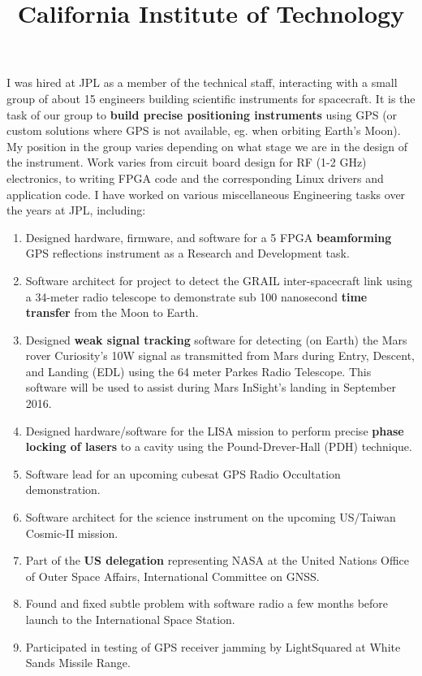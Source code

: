 \begin{resume}
\title{\bf California Institute of Technology}
\begin{position}
    I was hired at JPL as a member of the technical staff, interacting with a small group of about 15 engineers building scientific instruments for spacecraft. It is the task of our group to {\bf build precise positioning instruments} using GPS (or custom solutions where GPS is not available, eg. when orbiting Earth's Moon). My position in the group varies depending on what stage we are in the design of the instrument. Work varies from circuit board design for RF (1-2 GHz) electronics, to writing FPGA code and the corresponding Linux drivers and application code. I have worked on various miscellaneous Engineering tasks over the years at JPL, including:
    \begin{enumerate}
        \item Designed hardware, firmware, and software for a 5 FPGA {\bf beamforming} GPS reflections instrument as a Research and Development task.
        \item Software architect for project to detect the GRAIL inter-spacecraft link using a 34-meter radio telescope to demonstrate sub 100 nanosecond {\bf time transfer} from the Moon to Earth.
        \item Designed {\bf weak signal tracking} software for detecting (on Earth) the Mars rover Curiosity's 10W signal as transmitted from Mars during Entry, Descent, and Landing (EDL) using the 64 meter Parkes Radio Telescope. This software will be used to assist during Mars InSight's landing in September 2016.
        \item Designed hardware/software for the LISA mission to perform precise {\bf phase locking of lasers} to a cavity using the Pound-Drever-Hall (PDH) technique.
            \item Software lead for an upcoming cubesat GPS Radio Occultation demonstration.
            \item Software architect for the science instrument on the upcoming US/Taiwan Cosmic-II mission.
            \item Part of the {\bf US delegation} representing NASA at the United Nations Office of Outer Space Affairs, International Committee on GNSS.
            \item Found and fixed subtle problem with software radio a few months before launch to the International Space Station.
            \item Participated in testing of GPS receiver jamming by LightSquared at White Sands Missile Range.
    \end{enumerate}



\end{position}
\end{resume}
